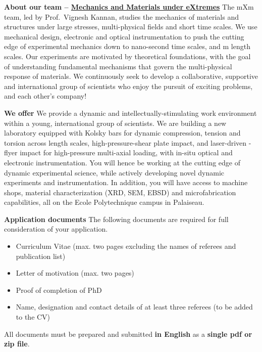 \documentclass[a4paper,11pt,fleqn]{article}
\begin{document}
	\vspace*{-3em}
	\begin{myhlbox}{\textbf{About our team -- \href{https://vigneshkannan-group.github.io/vk-mxm-website/}{Mechanics and Materials under eXtremes}}}
		The mXm team, led by Prof.~Vignesh Kannan, studies the mechanics of materials and structures under large stresses, multi-physical fields and short time scales. We use mechanical design, electronic and optical instrumentation to push the cutting edge of experimental mechanics down to nano-second time scales, and \textmu m length scales. Our experiments are motivated by theoretical foundations, with the goal of understanding fundamental mechanisms that govern the multi-physical response of materials. We continuously seek to develop a collaborative, supportive and international group of scientists who enjoy the pursuit of exciting problems, and each other's company!
	\end{myhlbox}

	\begin{myhlbox}{\textbf{We offer}}
		We provide a dynamic and intellectually-stimulating work environment within a young, international group of scientists. We are building a new laboratory equipped with Kolsky bars for dynamic compression, tension and torsion across length scales, high-pressure-shear plate impact, and laser-driven \textmu-flyer impact for high-pressure multi-axial loading, with in-situ optical and electronic instrumentation. You will hence be working at the cutting edge of dynamic experimental science, while actively developing novel dynamic experiments and instrumentation. In addition, you will have access to machine shops, material characterization (XRD, SEM, EBSD) and microfabrication capabilities, all on the Ecole Polytechnique campus in Palaiseau. 
	\end{myhlbox}

	\begin{myhlbox}{\textbf{Application documents}}
		The following documents are required for full consideration of your application. 
		\begin{itemize}[leftmargin=*, itemsep=-0.25em]
			\item Curriculum Vitae (max. two pages excluding the names of referees and publication list)
			\item Letter of motivation (max. two pages)
			\item Proof of completion of PhD
			\item Name, designation and contact details of at least three referees (to be added to the CV)
		\end{itemize}
		\vspace{0em}
		All documents must be prepared and submitted \textbf{in English} as a \textbf{single pdf or zip file}. 
	\end{myhlbox}
\end{document}
